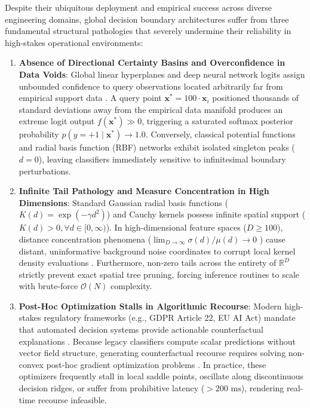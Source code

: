 \documentclass[times, review, 10pt]{elsarticle}
\begin{document}
Despite their ubiquitous deployment and empirical success across diverse engineering domains, global decision boundary architectures suffer from three fundamental structural pathologies that severely undermine their reliability in high-stakes operational environments:
\begin{enumerate}
    \item \textbf{Absence of Directional Certainty Basins and Overconfidence in Data Voids}: Global linear hyperplanes and deep neural network logits assign unbounded confidence to query observations located arbitrarily far from empirical support data \cite{szegedy2014intriguing,goodfellow2014explaining}. A query point $\mathbf{x}^* = 100 \cdot \mathbf{x}_i$ positioned thousands of standard deviations away from the empirical data manifold produces an extreme logit output $f(\mathbf{x}^*) \gg 0$, triggering a saturated softmax posterior probability $p(y=+1 \mid \mathbf{x}^*) \to 1.0$. Conversely, classical potential functions \cite{aizerman1964theoretical,parzen1962estimation,nadaraya1964estimating} and radial basis function (RBF) networks \cite{broomhead1988multivariable} exhibit isolated singleton peaks ($d=0$), leaving classifiers immediately sensitive to infinitesimal boundary perturbations.
    \item \textbf{Infinite Tail Pathology and Measure Concentration in High Dimensions}: Standard Gaussian radial basis functions ($K(d) = \exp(-\gamma d^2)$) and Cauchy kernels possess infinite spatial support ($K(d) > 0, \forall d \in [0, \infty)$). In high-dimensional feature spaces ($D \ge 100$), distance concentration phenomena ($\lim_{D \to \infty} \sigma(d)/\mu(d) \to 0$ \cite{beyer1999nearest}) cause distant, uninformative background noise coordinates to corrupt local kernel density evaluations \cite{weinberger2009distance}. Furthermore, non-zero tails across the entirety of $\mathbb{R}^D$ strictly prevent exact spatial tree pruning, forcing inference routines to scale with brute-force $\mathcal{O}(N)$ complexity.
    \item \textbf{Post-Hoc Optimization Stalls in Algorithmic Recourse}: Modern high-stakes regulatory frameworks (e.g., GDPR Article 22, EU AI Act) mandate that automated decision systems provide actionable counterfactual explanations \cite{wachter2017counterfactual,verma2022counterfactual_tpami,guidotti2018survey}. Because legacy classifiers compute scalar predictions without vector field structure, generating counterfactual recourse requires solving non-convex post-hoc gradient optimization problems \cite{wachter2017counterfactual,mothilal2020explaining,ustun2019actionable}. In practice, these optimizers frequently stall in local saddle points, oscillate along discontinuous decision ridges, or suffer from prohibitive latency ($>200\text{ ms}$), rendering real-time recourse infeasible.
\end{enumerate}
\end{document}
